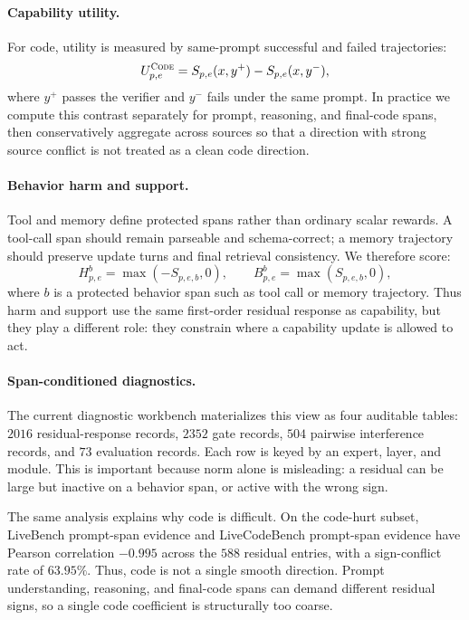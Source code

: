 \documentclass{article}
\newcommand{\code}{\textsc{Code}\xspace}
\begin{document}
\paragraph{Capability utility.}
For code, utility is measured by same-prompt successful and failed trajectories:
\begin{equation}
    U_{p,e}^{\code}=
    S_{p,e}(x,y^{+})-S_{p,e}(x,y^{-}),
\end{equation}
where $y^{+}$ passes the verifier and $y^{-}$ fails under the same prompt.  In practice we compute this contrast separately for prompt, reasoning, and final-code spans, then conservatively aggregate across sources so that a direction with strong source conflict is not treated as a clean code direction.

\paragraph{Behavior harm and support.}
Tool and memory define protected spans rather than ordinary scalar rewards.  A tool-call span should remain parseable and schema-correct; a memory trajectory should preserve update turns and final retrieval consistency.  We therefore score:
\begin{equation}
    H_{p,e}^{b}=\max(-S_{p,e,b},0),
    \qquad
    B_{p,e}^{b}=\max(S_{p,e,b},0),
\end{equation}
where $b$ is a protected behavior span such as tool call or memory trajectory.  Thus harm and support use the same first-order residual response as capability, but they play a different role: they constrain where a capability update is allowed to act.

\paragraph{Span-conditioned diagnostics.}
The current diagnostic workbench materializes this view as four auditable tables: $2016$ residual-response records, $2352$ gate records, $504$ pairwise interference records, and $73$ evaluation records.  Each row is keyed by an expert, layer, and module.  This is important because norm alone is misleading: a residual can be large but inactive on a behavior span, or active with the wrong sign.

The same analysis explains why code is difficult.  On the code-hurt subset, LiveBench prompt-span evidence and LiveCodeBench prompt-span evidence have Pearson correlation $-0.995$ across the $588$ residual entries, with a sign-conflict rate of $63.95\%$.  Thus, code is not a single smooth direction.  Prompt understanding, reasoning, and final-code spans can demand different residual signs, so a single code coefficient is structurally too coarse.
\end{document}
